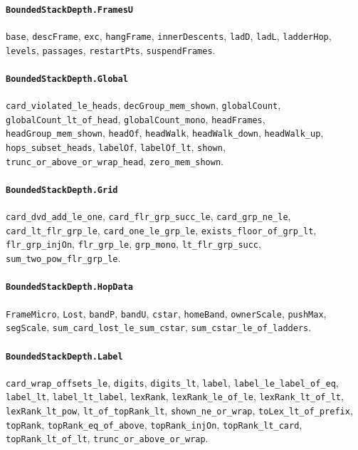 \paragraph{\texttt{BoundedStackDepth.FramesU}}
{\small\raggedright \texttt{base}, \texttt{descFrame}, \texttt{exc}, \texttt{hangFrame}, \texttt{innerDescents}, \texttt{ladD}, \texttt{ladL}, \texttt{ladderHop}, \texttt{levels}, \texttt{passages}, \texttt{restartPts}, \texttt{suspendFrames}.\par}

\paragraph{\texttt{BoundedStackDepth.Global}}
{\small\raggedright \texttt{card\_violated\_le\_heads}, \texttt{decGroup\_mem\_shown}, \texttt{globalCount}, \texttt{globalCount\_lt\_of\_head}, \texttt{globalCount\_mono}, \texttt{headFrames}, \texttt{headGroup\_mem\_shown}, \texttt{headOf}, \texttt{headWalk}, \texttt{headWalk\_down}, \texttt{headWalk\_up}, \texttt{hops\_subset\_heads}, \texttt{labelOf}, \texttt{labelOf\_lt}, \texttt{shown}, \texttt{trunc\_or\_above\_or\_wrap\_head}, \texttt{zero\_mem\_shown}.\par}

\paragraph{\texttt{BoundedStackDepth.Grid}}
{\small\raggedright \texttt{card\_dvd\_add\_le\_one}, \texttt{card\_flr\_grp\_succ\_le}, \texttt{card\_grp\_ne\_le}, \texttt{card\_lt\_flr\_grp\_le}, \texttt{card\_one\_le\_grp\_le}, \texttt{exists\_floor\_of\_grp\_lt}, \texttt{flr\_grp\_injOn}, \texttt{flr\_grp\_le}, \texttt{grp\_mono}, \texttt{lt\_flr\_grp\_succ}, \texttt{sum\_two\_pow\_flr\_grp\_le}.\par}

\paragraph{\texttt{BoundedStackDepth.HopData}}
{\small\raggedright \texttt{FrameMicro}, \texttt{Lost}, \texttt{bandP}, \texttt{bandU}, \texttt{cstar}, \texttt{homeBand}, \texttt{ownerScale}, \texttt{pushMax}, \texttt{segScale}, \texttt{sum\_card\_lost\_le\_sum\_cstar}, \texttt{sum\_cstar\_le\_of\_ladders}.\par}

\paragraph{\texttt{BoundedStackDepth.Label}}
{\small\raggedright \texttt{card\_wrap\_offsets\_le}, \texttt{digits}, \texttt{digits\_lt}, \texttt{label}, \texttt{label\_le\_label\_of\_eq}, \texttt{label\_lt}, \texttt{label\_lt\_label}, \texttt{lexRank}, \texttt{lexRank\_le\_of\_le}, \texttt{lexRank\_lt\_of\_lt}, \texttt{lexRank\_lt\_pow}, \texttt{lt\_of\_topRank\_lt}, \texttt{shown\_ne\_or\_wrap}, \texttt{toLex\_lt\_of\_prefix}, \texttt{topRank}, \texttt{topRank\_eq\_of\_above}, \texttt{topRank\_injOn}, \texttt{topRank\_lt\_card}, \texttt{topRank\_lt\_of\_lt}, \texttt{trunc\_or\_above\_or\_wrap}.\par}

